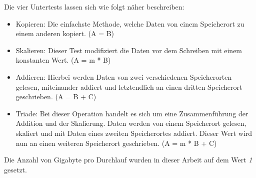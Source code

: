 Die vier Untertests lassen sich wie folgt näher beschreiben:\\
\begin{itemize}
  \item Kopieren: Die einfachste Methode, welche Daten von einem Speicherort zu einem anderen kopiert. (A = B)
  \item Skalieren: Dieser Test modifiziert die Daten vor dem Schreiben mit einem konstanten Wert. (A = m * B)
  \item Addieren: Hierbei werden Daten von zwei verschiedenen Speicherorten gelesen, miteinander addiert und letztendlich an einen dritten Speicherort geschrieben. (A = B + C)
  \item Triade: Bei dieser Operation handelt es sich um eine Zusammenführung der Addition und der Skalierung. Daten werden von einem Speicherort gelesen, skaliert und mit Daten eines zweiten Speicherortes
                addiert. Dieser Wert wird nun an einen weiteren Speicherort geschrieben. (A = m * B + C)
\end{itemize}

Die Anzahl von Gigabyte pro Durchlauf wurden in dieser Arbeit auf dem Wert \emph{1} gesetzt.

